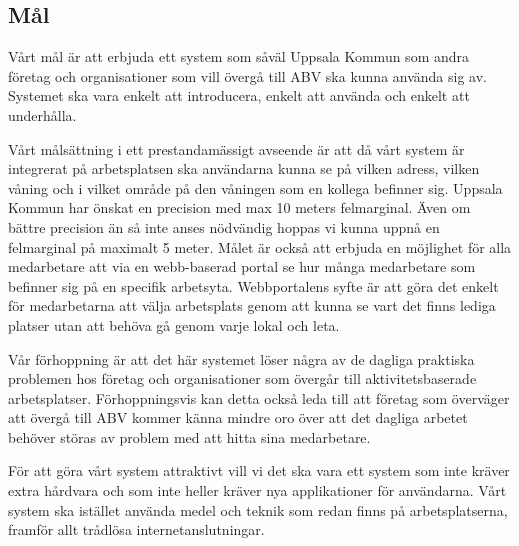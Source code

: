 \documentclass[swedish, a4paper,12pt]{article}
\begin{document}
\subsection{Mål}

Vårt mål är att erbjuda ett system som såväl Uppsala Kommun som andra företag och organisationer som vill övergå till ABV ska kunna använda sig av. Systemet ska vara enkelt att introducera, enkelt att använda och enkelt att underhålla.

Vårt målsättning i ett prestandamässigt avseende är att då vårt system är integrerat på arbetsplatsen ska användarna kunna se på vilken adress, vilken våning och i vilket område på den våningen som en kollega befinner sig. Uppsala Kommun har önskat en precision med max 10 meters felmarginal. Även om bättre precision än så inte anses nödvändig hoppas vi kunna uppnå en felmarginal på maximalt 5 meter. Målet är också att erbjuda en möjlighet för alla medarbetare att via en webb-baserad portal se hur många medarbetare som befinner sig på en specifik arbetsyta. Webbportalens syfte är att göra det enkelt för medarbetarna att välja arbetsplats genom att kunna se vart det finns lediga platser utan att behöva gå genom varje lokal och leta.

Vår förhoppning är att det här systemet löser några av de dagliga praktiska problemen hos företag och organisationer som övergår till aktivitetsbaserade arbetsplatser. Förhoppningsvis kan detta också leda till att företag som överväger att övergå till ABV kommer känna mindre oro över att det dagliga arbetet behöver störas av problem med att hitta sina medarbetare.

För att göra vårt system attraktivt vill vi det ska vara ett system som inte kräver extra hårdvara och som inte heller kräver nya applikationer för användarna. Vårt system ska istället använda medel och teknik som redan finns på arbetsplatserna, framför allt trådlösa internetanslutningar.







\end{document}
